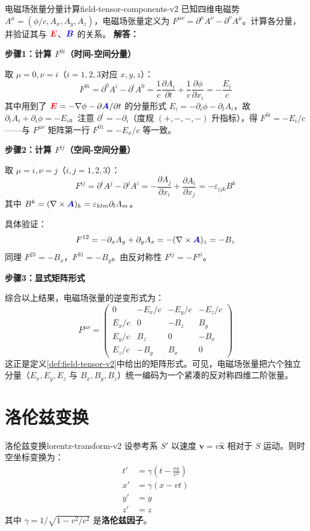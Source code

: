 \documentclass[11pt,a4paper,openany,oneside]{book}
\newcommand{\vecE}{\textcolor{red}{\vect{E}}}
\newcommand{\vecB}{\textcolor{blue}{\vect{B}}}
\newcommand{\vecA}{\textcolor{blue!70!black}{\vect{A}}}
\newcommand{\vect}[1]{\bm{#1}}
\newcommand{\unitvec}[1]{\hat{\vect{#1}}}
\newcommand{\difficulty}[1]{\marginnote{\textcolor{red}{\textbf{[#1]}}}}
\begin{document}
\begin{example}{电磁场张量分量计算}{field-tensor-components-v2}
\difficulty{提高}
已知四维电磁势 $A^\mu=(\phi/c, A_x, A_y, A_z)$，电磁场张量定义为 $F^{\mu\nu}=\partial^\mu A^\nu - \partial^\nu A^\mu$。计算各分量，并验证其与 $\vecE$、$\vecB$ 的关系。
\tcblower
\textbf{解答：}

\textbf{步骤1：计算 $F^{0i}$（时间-空间分量）}

取 $\mu=0, \nu=i$（$i=1,2,3$对应 $x,y,z$）：
\[
F^{0i} = \partial^0 A^i - \partial^i A^0 = \frac{1}{c}\frac{\partial A_i}{\partial t} + \frac{1}{c}\frac{\partial\phi}{\partial x_i} = -\frac{E_i}{c}
\]
其中用到了 $\vecE=-\nabla\phi-\partial\vecA/\partial t$ 的分量形式 $E_i = -\partial_i\phi - \partial_t A_i$，故 $\partial_t A_i + \partial_i\phi = -E_i$。注意 $\partial^i = -\partial_i$（度规 $(+,-,-,-)$ 升指标），得 $F^{0i} = -E_i/c$——与 $F^{\mu\nu}$ 矩阵第一行 $F^{01} = -E_x/c$ 等一致。

\textbf{步骤2：计算 $F^{ij}$（空间-空间分量）}

取 $\mu=i, \nu=j$（$i,j=1,2,3$）：
\[
F^{ij} = \partial^i A^j - \partial^j A^i = -\frac{\partial A_j}{\partial x_i} + \frac{\partial A_i}{\partial x_j} = -\varepsilon_{ijk}B^k
\]
其中 $B^k = (\nabla\times\vecA)_k = \varepsilon_{klm}\partial_l A_m$。

具体验证：
\[
F^{12} = -\partial_x A_y + \partial_y A_x = -(\nabla\times\vecA)_z = -B_z
\]
同理 $F^{23}=-B_x$，$F^{31}=-B_y$。由反对称性 $F^{ij}=-F^{ji}$。

\textbf{步骤3：显式矩阵形式}

综合以上结果，电磁场张量的逆变形式为：
\[
F^{\mu\nu} = \begin{pmatrix}
0 & -E_x/c & -E_y/c & -E_z/c \\
E_x/c & 0 & -B_z & B_y \\
E_y/c & B_z & 0 & -B_x \\
E_z/c & -B_y & B_x & 0
\end{pmatrix}
\]
这正是定义\ref{def:field-tensor-v2}中给出的矩阵形式。可见，电磁场张量把六个独立分量（$E_x,E_y,E_z$ 与 $B_x,B_y,B_z$）统一编码为一个紧凑的反对称四维二阶张量。
\end{example}

\section{洛伦兹变换}

\begin{theorem}{洛伦兹变换}{lorentz-transform-v2}
设参考系 $S'$ 以速度 $\vect{v} = v\unitvec{x}$ 相对于 $S$ 运动。则时空坐标变换为：
\begin{align}
t' &= \gamma\left(t - \frac{vx}{c^2}\right) \\
x' &= \gamma(x - vt) \\
y' &= y \\
z' &= z
\end{align}
其中 $\gamma = 1/\sqrt{1 - v^2/c^2}$ 是\textbf{洛伦兹因子}。
\end{theorem}
\end{document}
